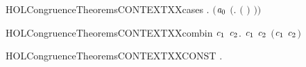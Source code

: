 \begin{SaveVerbatim}{HOLCongruenceTheoremsCONTEXTXXcases}
       \HOLSymConst{\HOLTokenExists{}} . \ensuremath{(}\ensuremath{\HOLBoundVar{a}\sb{\mathrm{0}}} \HOLSymConst{\ensuremath{=}} \ensuremath{(}\HOLTokenLambda{}.  \ensuremath{(} \ensuremath{)} \ensuremath{)}\ensuremath{)} \HOLSymConst{\HOLTokenConj{}}  
\end{SaveVerbatim}
\newcommand{\HOLCongruenceTheoremsCONTEXTXXcases}{\UseVerbatim{HOLCongruenceTheoremsCONTEXTXXcases}}
\begin{SaveVerbatim}{HOLCongruenceTheoremsCONTEXTXXcombin}
\HOLTokenTurnstile{} \HOLSymConst{\HOLTokenForall{}}\ensuremath{\HOLBoundVar{c}\sb{\mathrm{1}}} \ensuremath{\HOLBoundVar{c}\sb{\mathrm{2}}}.  \ensuremath{\HOLBoundVar{c}\sb{\mathrm{1}}} \HOLSymConst{\HOLTokenConj{}}  \ensuremath{\HOLBoundVar{c}\sb{\mathrm{2}}} \HOLSymConst{\HOLTokenImp{}}  \ensuremath{(}\ensuremath{\HOLBoundVar{c}\sb{\mathrm{1}}} \HOLConst{\HOLTokenCompose} \ensuremath{\HOLBoundVar{c}\sb{\mathrm{2}}}\ensuremath{)}
\end{SaveVerbatim}
\newcommand{\HOLCongruenceTheoremsCONTEXTXXcombin}{\UseVerbatim{HOLCongruenceTheoremsCONTEXTXXcombin}}
\begin{SaveVerbatim}{HOLCongruenceTheoremsCONTEXTXXCONST}
\HOLTokenTurnstile{} \HOLSymConst{\HOLTokenForall{}}.   \HOLSymConst{\HOLTokenImp{}}  
\end{SaveVerbatim}
\newcommand{\HOLCongruenceTheoremsCONTEXTXXCONST}{\UseVerbatim{HOLCongruenceTheoremsCONTEXTXXCONST}}
